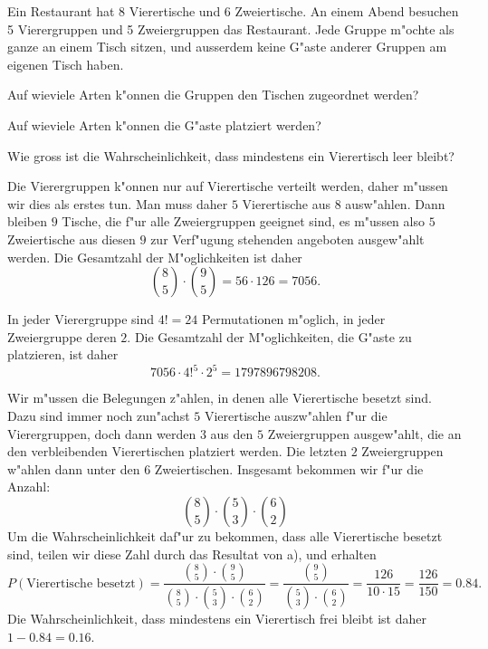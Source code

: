 Ein Restaurant hat 8 Vierertische und 6 Zweiertische.
An einem Abend besuchen 5 Vierergruppen und 5 Zweiergruppen das Restaurant.
Jede Gruppe m"ochte als ganze an einem Tisch sitzen, und ausserdem
keine G"aste anderer Gruppen am eigenen Tisch haben.
\begin{teilaufgaben}
\item Auf wieviele Arten k"onnen die Gruppen den Tischen zugeordnet
werden?
\item Auf wieviele Arten k"onnen die G"aste platziert werden?
\item Wie gross ist die Wahrscheinlichkeit, dass mindestens ein Vierertisch
leer bleibt?
\end{teilaufgaben}

\begin{loesung}
\begin{teilaufgaben}
\item
Die Vierergruppen k"onnen nur auf Vierertische verteilt werden,
daher m"ussen wir dies als erstes tun.
Man muss daher $5$ Vierertische aus $8$ ausw"ahlen.
Dann bleiben $9$ Tische, die f"ur alle Zweiergruppen geeignet sind,
es m"ussen also $5$ Zweiertische aus diesen $9$ zur Verf"ugung stehenden
angeboten ausgew"ahlt werden. 
Die Gesamtzahl der M"oglichkeiten ist daher
\[
\binom{8}{5}\cdot\binom{9}{5}=
56\cdot 126=7056.
\]
\item
In jeder Vierergruppe sind $4!=24$ Permutationen m"oglich, in jeder
Zweiergruppe deren $2$.
Die Gesamtzahl der M"oglichkeiten, die G"aste zu platzieren, ist daher
\[
7056\cdot 4!^5 \cdot 2^5=1797896798208.
\]
\item
Wir m"ussen die Belegungen z"ahlen, in denen alle Vierertische
besetzt sind. 
Dazu sind immer noch zun"achst $5$ Vierertische auszw"ahlen f"ur
die Vierergruppen, doch dann werden $3$ aus den $5$ Zweiergruppen ausgew"ahlt,
die an den verbleibenden Vierertischen platziert werden.
Die letzten $2$ Zweiergruppen w"ahlen dann unter den $6$ Zweiertischen.
Insgesamt bekommen wir f"ur die Anzahl:
\[
\binom{8}{5}\cdot \binom{5}{3}\cdot \binom{6}{2}
\]
Um die Wahrscheinlichkeit daf"ur zu bekommen, dass alle Vierertische
besetzt sind, teilen wir diese Zahl durch das Resultat von a), und
erhalten
\[
P(\text{Vierertische besetzt})
=
\frac{\binom{8}{5}\cdot\binom{9}{5}}{
\binom{8}{5}\cdot \binom{5}{3}\cdot \binom{6}{2}}
=
\frac{\binom{9}{5}}{\binom{5}{3}\cdot \binom{6}{2}}
=
\frac{126}{10\cdot 15}=\frac{126}{150}=0.84.
\]
Die Wahrscheinlichkeit, dass mindestens ein Vierertisch frei bleibt ist
daher $1-0.84=0.16$.
\qedhere
\end{teilaufgaben}
\end{loesung}


